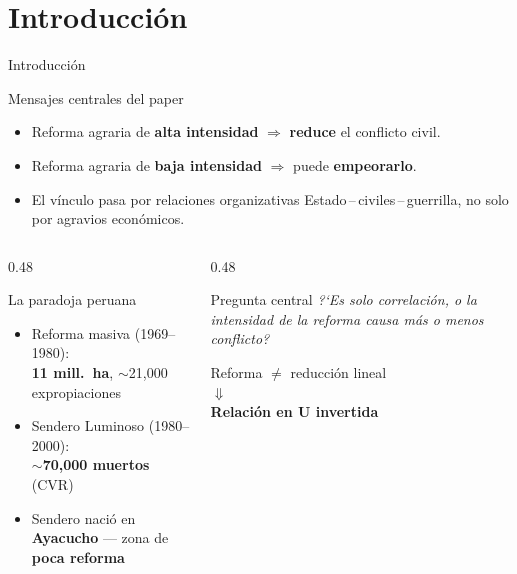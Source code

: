 \documentclass[aspectratio=169,t]{beamer}
\newcommand{\hl}[1]{\textcolor{azulmedio}{\textbf{#1}}}
\begin{document}
\section{Introducci\'on}

\begin{frame}{Introducci\'on}
\begin{block}{Mensajes centrales del paper}
\small\begin{itemize}
  \item Reforma agraria de \hl{alta intensidad}
        $\Rightarrow$ \hl{reduce} el conflicto civil.
  \item Reforma agraria de \hl{baja intensidad}
        $\Rightarrow$ puede \hl{empeorarlo}.
  \item El v\'inculo pasa por relaciones organizativas
        Estado\,--\,civiles\,--\,guerrilla,
        no solo por agravios econ\'omicos.
\end{itemize}
\end{block}
\vspace{0.15cm}
\begin{columns}[T]
  \begin{column}{0.48\textwidth}
    \begin{alertblock}{La paradoja peruana}
    \small\begin{itemize}
      \item Reforma masiva (1969--1980):\\
            \hl{11 mill.\ ha},
            $\sim$21{,}000 expropiaciones
      \item Sendero Luminoso (1980--2000):\\
            \hl{$\sim$70{,}000 muertos} (CVR)
      \item Sendero naci\'o en \textbf{Ayacucho}
            --- zona de \hl{poca reforma}
    \end{itemize}
    \end{alertblock}
  \end{column}
  \begin{column}{0.48\textwidth}
    \begin{exampleblock}{Pregunta central}
    \small\textit{?`Es solo correlaci\'on, o la
    intensidad de la reforma causa m\'as o menos
    conflicto?}
    \vspace{0.15cm}

    \centering
    Reforma $\neq$ reducci\'on lineal\\[0.08cm]
    $\Downarrow$\\[0.05cm]
    \textbf{Relaci\'on en U invertida}
    \end{exampleblock}
  \end{column}
\end{columns}
\end{frame}
\end{document}
